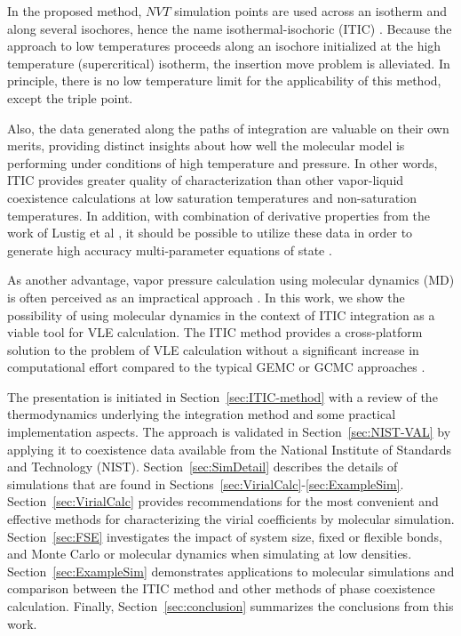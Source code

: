 \documentclass[5p,times]{elsarticle}
\begin{document}
In the proposed method, $NVT$ simulation points are used across an isotherm and along several isochores, hence the name isothermal-isochoric (ITIC) \cite{Razavi2016}. Because the approach to low temperatures proceeds along an isochore initialized at the high temperature (supercritical) isotherm, the insertion move problem is alleviated. In principle, there is no low temperature limit for the applicability of this method, except the triple point. 

Also, the data generated along the paths of integration are valuable on their own merits, providing distinct insights about how well the molecular model is performing under conditions of high temperature and pressure. In other words, ITIC provides greater quality of characterization than other vapor-liquid coexistence calculations at low saturation temperatures and non-saturation temperatures. In addition, with combination of derivative properties from the work of Lustig et al \cite{Lustig2015}, it should be possible to utilize these data in order to generate high accuracy multi-parameter equations of state \cite{Thol2016_LJ,Thol2016_siloxane,Thol2016_siloxane_first,Thol2017,Rutkai2013,Rutkai2015,Thol2015,Thol2015b}.

As another advantage, vapor pressure calculation using molecular dynamics (MD) is often perceived as an impractical approach \cite{Nieto-Draghi2015}. In this work, we show the possibility of using molecular dynamics in the context of ITIC integration as a viable tool for VLE calculation. The ITIC method provides a cross-platform solution to the problem of VLE calculation without a significant increase in computational effort compared to the typical GEMC or GCMC approaches \cite{Razavi2016,Messerly2018}.
 
The presentation is initiated in Section~\ref{sec:ITIC-method} with a review of the thermodynamics underlying the integration method and some practical implementation aspects. The approach is validated in Section~\ref{sec:NIST-VAL} by applying it to coexistence data available from the National Institute of Standards and Technology (NIST). Section~\ref{sec:SimDetail} describes the details of simulations that are found in Sections~\ref{sec:VirialCalc}-\ref{sec:ExampleSim}. Section~\ref{sec:VirialCalc} provides recommendations for the most convenient and effective methods for characterizing the virial coefficients by molecular simulation. Section~\ref{sec:FSE} investigates the impact of system size, fixed or flexible bonds, and Monte Carlo or molecular dynamics when simulating at low densities. Section~\ref{sec:ExampleSim} demonstrates applications to molecular simulations and comparison between the ITIC method and other methods of phase coexistence calculation. Finally, Section~\ref{sec:conclusion} summarizes the conclusions from this work.
\end{document}
